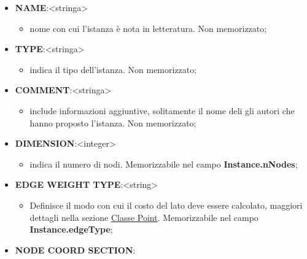 \documentclass[11pt]{article}
\begin{document}
\begin{itemize}
    \item \textbf{NAME}:<stringa>
    \begin{itemize}
    \item nome con cui l'istanza è nota in letteratura. Non memorizzato;
    \end{itemize}

    \item \textbf{TYPE}:<stringa>
        \begin{itemize}
    \item indica il tipo dell'istanza. Non memorizzato;
    \end{itemize}
     
    \item \textbf{COMMENT}:<stringa>
    \begin{itemize}
    \item include informazioni aggiuntive, solitamente il nome deli gli autori che hanno proposto l'istanza. Non memorizzato;
    \end{itemize}
    
    \item \textbf{DIMENSION}:<integer>
    \begin{itemize}
    \item indica il numero di nodi. Memorizzabile nel campo \textbf{Instance.nNodes};
    \end{itemize}
    
    \item \textbf{EDGE WEIGHT TYPE}:<string>
    \begin{itemize}
    \item Definisce il modo con cui il costo del lato deve essere calcolato, maggiori dettagli nella sezione \hyperref[sec:ClassePointS]{Classe Point}. Memorizzabile nel campo \textbf{Instance.edgeType};
    \end{itemize}
    
    \item \textbf{NODE COORD SECTION}:
    \begin{itemize}
    

\end{itemize}
\end{itemize}
\end{document}
